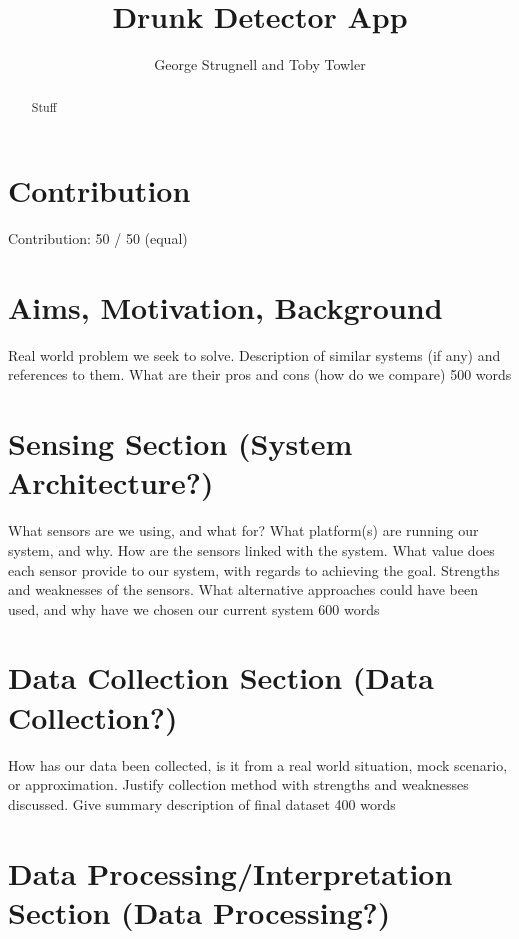 \documentclass[]{article}
\title{Drunk Detector App}
\author{George Strugnell and Toby Towler}
\begin{document}
	
\maketitle

\tableofcontents

\begin{abstract}
	
	Stuff
	
\end{abstract}

\section{Contribution}

	Contribution: 50 / 50 (equal)

\section{Aims, Motivation, Background}

	Real world problem we seek to solve. Description of similar systems (if any) and references to them. What are their pros and cons (how do we compare)
	500 words
	
\section{Sensing Section (System Architecture?)}

	What sensors are we using, and what for? What platform(s) are running our system, and why. How are the sensors linked with the system. What value does each sensor provide to our system, with regards to achieving the goal. Strengths and weaknesses of the sensors. What alternative approaches could have been used, and why have we chosen our current system
	600 words
	
\section{Data Collection Section (Data Collection?)}
	
	How has our data been collected, is it from a real world situation, mock scenario, or approximation. Justify collection method with strengths and weaknesses discussed. Give summary description of final dataset
	400 words

\section{Data Processing/Interpretation Section (Data Processing?)}
	
\end{document}
